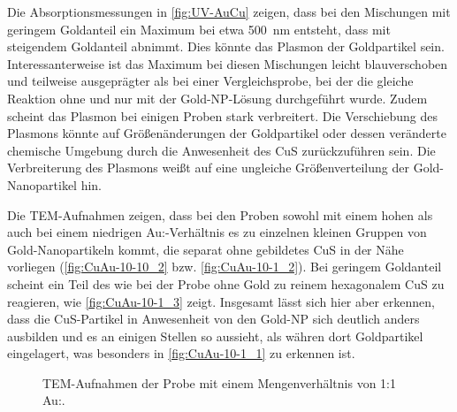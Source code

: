 	Die Absorptionsmessungen in \cref{fig:UV-AuCu} zeigen, dass bei den Mischungen mit geringem Goldanteil ein Maximum bei etwa \SI{500}{\nano\meter} entsteht, dass mit steigendem Goldanteil abnimmt.
	Dies könnte das Plasmon der Goldpartikel sein.
	Interessanterweise ist das Maximum bei diesen Mischungen leicht blauverschoben und teilweise ausgeprägter als bei einer Vergleichsprobe, bei der die gleiche Reaktion ohne  und nur mit der Gold-NP-Lösung durchgeführt wurde.
	Zudem scheint das Plasmon bei einigen Proben stark verbreitert.
	Die Verschiebung des Plasmons könnte auf Größenänderungen der Goldpartikel oder dessen veränderte chemische Umgebung durch die Anwesenheit des CuS zurückzuführen sein. 
	Die Verbreiterung des Plasmons weißt auf eine ungleiche Größenverteilung der Gold-Nanopartikel hin.
	
	Die TEM-Aufnahmen zeigen, dass bei den Proben sowohl mit einem hohen als auch bei einem niedrigen Au:-Verhältnis es zu einzelnen kleinen Gruppen von Gold-Nanopartikeln kommt, die separat ohne gebildetes CuS in der Nähe vorliegen (\cref{fig:CuAu-10-10_2} bzw. \cref{fig:CuAu-10-1_2}).
	Bei geringem Goldanteil scheint ein Teil des  wie bei der Probe ohne Gold zu reinem hexagonalem CuS zu reagieren, wie \cref{fig:CuAu-10-1_3} zeigt.
	Insgesamt lässt sich hier aber erkennen, dass die CuS-Partikel in Anwesenheit von den Gold-NP sich deutlich anders ausbilden und es an einigen Stellen so aussieht, als währen dort Goldpartikel eingelagert, was besonders in \cref{fig:CuAu-10-1_1} zu erkennen ist.
	
	\begin{figure}[htbp]
		\centering
		\caption{TEM-Aufnahmen der Probe mit einem Mengenverhältnis von 1:1 Au:.}
		\label{fig:TEM-CuAu-10-10}
	\end{figure}
	
